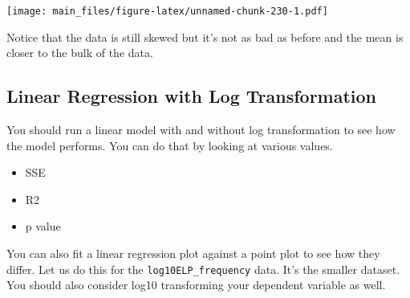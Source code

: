 \documentclass[
]{book}
\providecommand{\tightlist}{%
  \setlength{\itemsep}{0pt}\setlength{\parskip}{0pt}}
\begin{document}
\texttt{[image: main\_files/figure-latex/unnamed-chunk-230-1.pdf]}

Notice that the data is still skewed but it's not as bad as before and the mean is closer to the bulk of the data.

\hypertarget{linear-regression-with-log-transformation}{%
\subsection{Linear Regression with Log Transformation}\label{linear-regression-with-log-transformation}}

You should run a linear model with and without log transformation to see how the model performs. You can do that by looking at various values.

\begin{itemize}
\tightlist
\item
  SSE
\item
  R2
\item
  p value
\end{itemize}

You can also fit a linear regression plot against a point plot to see how they differ. Let us do this for the \texttt{log10ELP\_frequency} data. It's the smaller dataset. You should also consider log10 transforming your dependent variable as well.

  
\end{document}
